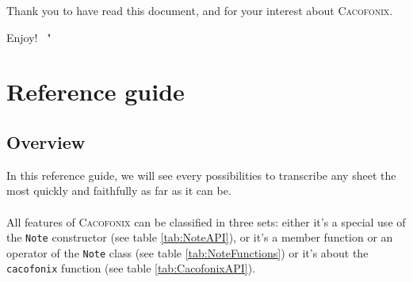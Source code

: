 \documentclass{article}
\newcommand\cacofonix{\textsc{Cacofonix}\xspace}
\newenvironment{myselfenv}{ \par \noindent \makebox[6em][r]{ \textcolor{myselfcolor}{Myself}: " --~}}{~"}
\newcommand{ \myself }[1]{%
\begin{myselfenv}%
	#1%
\end{myselfenv} }
\begin{document}
Thank you to have read this document, and for your interest about \cacofonix.

\myself{Enjoy!}

\section{Reference guide}

\subsection{Overview}

In this reference guide, we will see every possibilities to transcribe any sheet the most quickly and faithfully as far as it can be.

\paragraph{}

All features of \cacofonix can be classified in three sets: either it's a special use of the \lstinline!Note! constructor (see table \ref{tab:NoteAPI}), or it's a member function or an operator of the \lstinline!Note! class (see table \ref{tab:NoteFunctions}) or it's about the \lstinline!cacofonix! function (see table \ref{tab:CacofonixAPI}).
\end{document}
